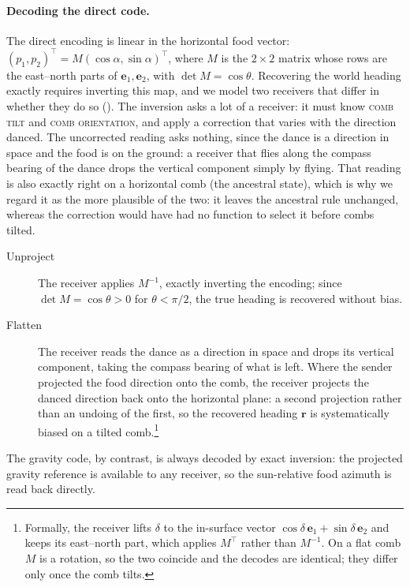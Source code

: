 \documentclass[11pt]{article}
\newcommand{\trait}[1]{\textsc{#1}}
\begin{document}
\paragraph{Decoding the direct code.}
The direct encoding is linear in the horizontal food vector:
$(p_1,p_2)^\top = M(\cos\alpha,\sin\alpha)^\top$, where $M$ is the $2\times 2$
matrix whose rows are the east--north parts of $\mathbf{e}_1,\mathbf{e}_2$, with
$\det M = \cos\theta$. Recovering the world heading exactly requires inverting
this map, and we model two receivers that differ in whether they do so
(). The inversion asks a lot of a receiver: it must know
\trait{comb tilt} and \trait{comb orientation}, and apply a correction that
varies with the direction danced. The uncorrected reading asks nothing, since the
dance is a direction in space and the food is on the ground: a receiver that
flies along the compass bearing of the dance drops the vertical component simply by
flying. That reading is also exactly right on a horizontal comb (the ancestral
state), which is why we regard it as the more plausible of the two: it leaves the
ancestral rule unchanged, whereas the correction would have had no function to
select it before combs tilted.
\begin{description}
  \item[Unproject] The receiver applies $M^{-1}$, exactly inverting the
    encoding; since $\det M = \cos\theta > 0$ for $\theta < \pi/2$, the true
    heading is recovered without bias.
  \item[Flatten] The receiver reads the dance as a direction in space and drops
    its vertical component, taking the compass bearing of what is left. Where
    the sender projected the food direction onto the comb, the receiver projects
    the danced direction back onto the horizontal plane: a second projection
    rather than an undoing of the first, so the recovered heading $\mathbf{r}$
    is systematically biased on a tilted comb.\footnote{Formally, the receiver
    lifts $\delta$ to the in-surface vector $\cos\delta\,\mathbf{e}_1 +
    \sin\delta\,\mathbf{e}_2$ and keeps its east--north part, which applies
    $M^\top$ rather than $M^{-1}$. On a flat comb $M$ is a rotation, so the two
    coincide and the decodes are identical; they differ only once the comb
    tilts.}
\end{description}

The gravity code, by contrast, is always decoded by exact inversion:
the projected gravity reference is available to any receiver, so the sun-relative
food azimuth is read back directly.
\end{document}
